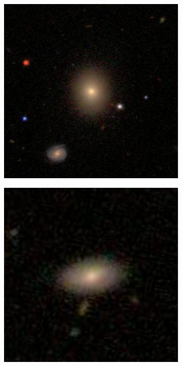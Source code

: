 \documentclass[12pt, onecolumn]{aa}
\begin{document}
\begin{figure}[h]
\begin{subfigure}[t]{0.23\linewidth}
    \includegraphics[width=\linewidth]{Figures/Wrongly_Classified/Lenticular/41950.jpg}
    \caption{}
    \label{fig:incorrect_2}
    \end{subfigure}
    \begin{subfigure}[t]{0.23\linewidth}
    \centering
    \includegraphics[width=\linewidth]{Figures/Wrongly_Classified/Spiral/13002.jpg}

\end{subfigure}
\end{figure}
\end{document}
